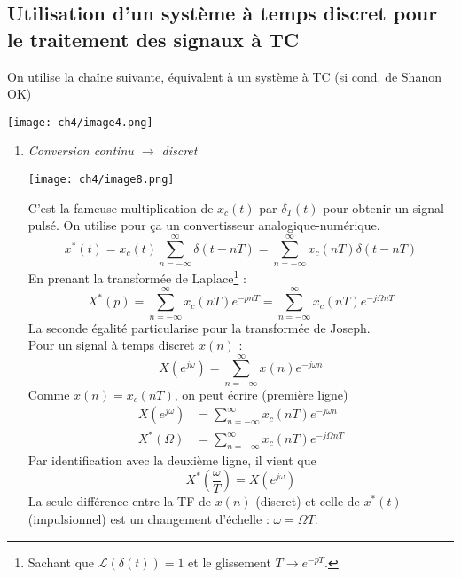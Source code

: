 	\subsection{Utilisation d'un système à temps discret pour le traitement des signaux à TC}
	On utilise la chaîne suivante, équivalent à un système à TC (si cond. de Shanon OK) 
	\begin{center}
	\texttt{[image: ch4/image4.png]}
	\end{center}
	\begin{enumerate}
	\item \textit{Conversion continu $\rightarrow$ discret}
\begin{center}
			\texttt{[image: ch4/image8.png]}
\end{center}
	C'est la fameuse multiplication de $x_c(t)$ par $\delta_T(t)$ pour obtenir un signal pulsé. On 
	utilise pour ça un convertisseur analogique-numérique.
	\begin{equation}
	x^*(t) = x_c(t)\sum_{n=-\infty}^\infty \delta(t-nT) = \sum_{n=-\infty}^\infty x_c(nT)
	\delta(t-nT) 
	\end{equation}
	En prenant la transformée de Laplace\footnote{Sachant que $\mathcal{L}(\delta(t))=1$ et le 
	glissement $T \rightarrow e^{-pT}$.} :
	\begin{equation}
	X^*(p) = \sum_{n=-\infty}^\infty x_c(nT)e^{-pnT} = \sum_{n=-\infty}^\infty x_c(nT)e^{-j\Omega nT}
	\end{equation}
	La seconde égalité particularise pour la transformée de Joseph.\\
	
	Pour un signal à temps discret $x(n)$ :
	\begin{equation}
	X(e^{j\omega}) = \sum_{n=-\infty}^\infty x(n)e^{-j\omega n}
	\end{equation}
	Comme $x(n) = x_c(nT)$, on peut écrire (première ligne)
	\begin{equation}
	\begin{array}{ll}
	X(e^{j\omega}) &= \sum_{n=-\infty}^\infty x_c(nT)e^{-j\omega n}\\
	X^*(\Omega) &= \sum_{n=-\infty}^\infty x_c(nT)e^{-j\Omega nT}
	\end{array}
	\end{equation}
	Par identification avec la deuxième ligne, il vient que
	\begin{equation}
	X^*\left(\frac{\omega}{T}\right) = X(e^{j\omega})
	\end{equation}
	La seule différence entre la TF de $x(n)$ (discret) et celle de $x^*(t)$ (impulsionnel) est 
	un changement d'échelle : $\omega = \Omega T$.
	

\end{enumerate}
